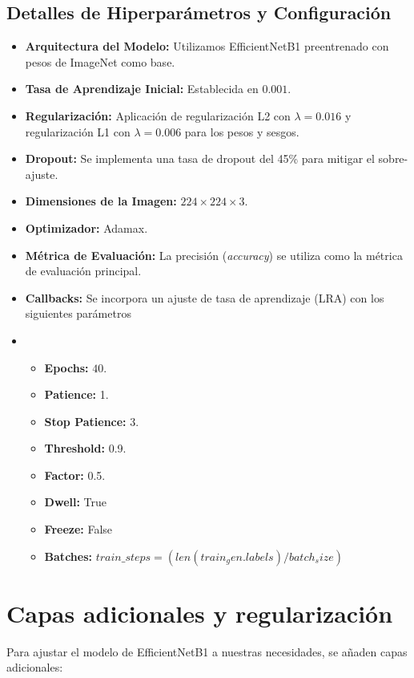 \subsection*{Detalles de Hiperparámetros y Configuración}

\begin{itemize}
   \item \textbf{Arquitectura del Modelo:} Utilizamos EfficientNetB1 preentrenado con pesos de ImageNet como base.
   \item \textbf{Tasa de Aprendizaje Inicial:} Establecida en $0.001$.
   \item \textbf{Regularización:} Aplicación de regularización L2 con $\lambda = 0.016$ y regularización L1 con $\lambda = 0.006$ para los pesos y sesgos.
   \item \textbf{Dropout:} Se implementa una tasa de dropout del 45\% para mitigar el sobre-ajuste.
   \item \textbf{Dimensiones de la Imagen:} $224 \times 224 \times 3$.
   \item \textbf{Optimizador:} Adamax.
   \item \textbf{Métrica de Evaluación:} La precisión (\textit{accuracy}) se utiliza como la métrica de evaluación principal.
   \item \textbf{Callbacks:} Se incorpora un ajuste de tasa de aprendizaje (LRA) con los siguientes parámetros
   \item \begin{itemize}
      \item \textbf{Epochs:} $40$.
      \item \textbf{Patience:} 1.      
      \item \textbf{Stop Patience:} 3.
      \item \textbf{Threshold:}  0.9.
      \item \textbf{Factor:} 0.5.      
      \item \textbf{Dwell:} True
      \item \textbf{Freeze:} False  
      \item \textbf{Batches:} $train\_steps = (len(train_gen.labels)/batch_size)$
   \end{itemize}
\end{itemize}

\section{Capas adicionales y regularización}
   
   Para ajustar el modelo de EfficientNetB1 a nuestras necesidades, se añaden capas adicionales:
   

